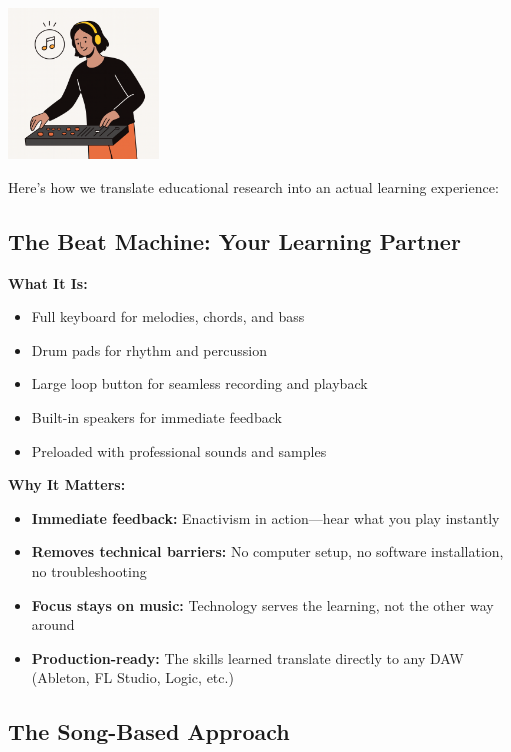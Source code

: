 \documentclass[11pt,letterpaper]{article}
\begin{document}
\begin{center}
\includegraphics[width=0.3\textwidth]{../../assets/images/illustrations/Producer.png}
\end{center}

\vspace{0.5cm}

Here's how we translate educational research into an actual learning experience:

\subsection*{The Beat Machine: Your Learning Partner}

\textbf{What It Is:}
\begin{itemize}[leftmargin=*]
\item Full keyboard for melodies, chords, and bass
\item Drum pads for rhythm and percussion
\item Large loop button for seamless recording and playback
\item Built-in speakers for immediate feedback
\item Preloaded with professional sounds and samples
\end{itemize}

\textbf{Why It Matters:}
\begin{itemize}[leftmargin=*]
\item \textbf{Immediate feedback:} Enactivism in action—hear what you play instantly
\item \textbf{Removes technical barriers:} No computer setup, no software installation, no troubleshooting
\item \textbf{Focus stays on music:} Technology serves the learning, not the other way around
\item \textbf{Production-ready:} The skills learned translate directly to any DAW (Ableton, FL Studio, Logic, etc.)
\end{itemize}

\subsection*{The Song-Based Approach}
\end{document}
